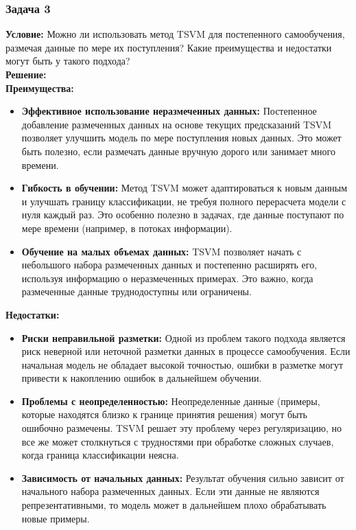 \subsubsection*{Задача 3}
\textbf{Условие:}
Можно ли использовать метод TSVM для постепенного самообучения, размечая данные по мере их поступления? Какие преимущества и недостатки могут быть у такого подхода?\\
\textbf{Решение:}\\
\textbf{Преимущества:}
\begin{itemize}
    \item \textbf{Эффективное использование неразмеченных данных:} Постепенное добавление размеченных данных на основе текущих предсказаний TSVM позволяет улучшить модель по мере поступления новых данных. Это может быть полезно, если размечать данные вручную дорого или занимает много времени.
    \item \textbf{Гибкость в обучении:} Метод TSVM может адаптироваться к новым данным и улучшать границу классификации, не требуя полного перерасчета модели с нуля каждый раз. Это особенно полезно в задачах, где данные поступают по мере времени (например, в потоках информации).
    \item \textbf{Обучение на малых объемах данных:} TSVM позволяет начать с небольшого набора размеченных данных и постепенно расширять его, используя информацию о неразмеченных примерах. Это важно, когда размеченные данные труднодоступны или ограничены.
\end{itemize}

\textbf{Недостатки:}
\begin{itemize}
    \item \textbf{Риски неправильной разметки:} Одной из проблем такого подхода является риск неверной или неточной разметки данных в процессе самообучения. Если начальная модель не обладает высокой точностью, ошибки в разметке могут привести к накоплению ошибок в дальнейшем обучении.
    \item \textbf{Проблемы с неопределенностью:} Неопределенные данные (примеры, которые находятся близко к границе принятия решения) могут быть ошибочно размечены. TSVM решает эту проблему через регуляризацию, но все же может столкнуться с трудностями при обработке сложных случаев, когда граница классификации неясна.
    \item \textbf{Зависимость от начальных данных:} Результат обучения сильно зависит от начального набора размеченных данных. Если эти данные не являются репрезентативными, то модель может в дальнейшем плохо обрабатывать новые примеры.
\end{itemize}

